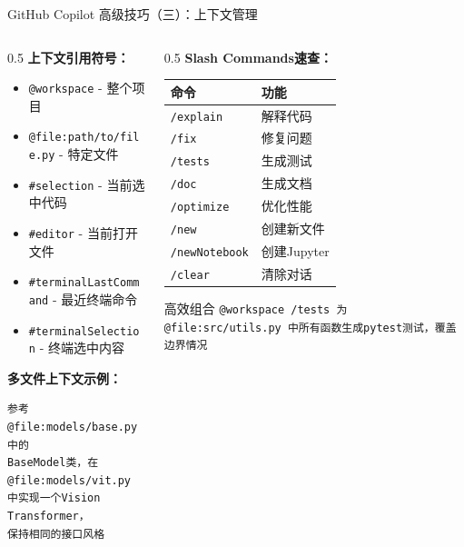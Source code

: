 \documentclass[aspectratio=169,11pt]{beamer}
\begin{document}
\begin{frame}[fragile]{GitHub Copilot 高级技巧（三）：上下文管理}
    \begin{columns}
        \begin{column}{0.5\textwidth}
            \textbf{上下文引用符号：}
            \begin{itemize}
                \item \texttt{@workspace} - 整个项目
                \item \texttt{@file:path/to/file.py} - 特定文件
                \item \texttt{\#selection} - 当前选中代码
                \item \texttt{\#editor} - 当前打开文件
                \item \texttt{\#terminalLastCommand} - 最近终端命令
                \item \texttt{\#terminalSelection} - 终端选中内容
            \end{itemize}
            
            \vspace{0.3cm}
            \textbf{多文件上下文示例：}
            \begin{lstlisting}[basicstyle=\ttfamily\tiny]
参考 @file:models/base.py 中的
BaseModel类，在 @file:models/vit.py
中实现一个Vision Transformer，
保持相同的接口风格
            \end{lstlisting}
        \end{column}
        \begin{column}{0.5\textwidth}
            \textbf{Slash Commands速查：}
            \footnotesize
            \begin{tabular}{ll}
                \toprule
                \textbf{命令} & \textbf{功能} \\
                \midrule
                \texttt{/explain} & 解释代码 \\
                \texttt{/fix} & 修复问题 \\
                \texttt{/tests} & 生成测试 \\
                \texttt{/doc} & 生成文档 \\
                \texttt{/optimize} & 优化性能 \\
                \texttt{/new} & 创建新文件 \\
                \texttt{/newNotebook} & 创建Jupyter \\
                \texttt{/clear} & 清除对话 \\
                \bottomrule
            \end{tabular}
            \normalsize
            
            \vspace{0.3cm}
            \begin{exampleblock}{高效组合}
                \scriptsize
                \texttt{@workspace /tests 为 @file:src/utils.py 中所有函数生成pytest测试，覆盖边界情况}
            \end{exampleblock}
        \end{column}
    \end{columns}
\end{frame}
\end{document}

